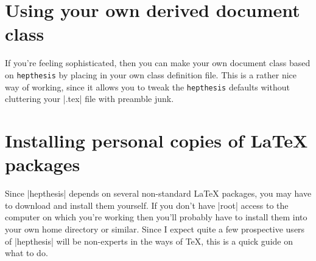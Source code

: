 \documentclass[12pt]{scrartcl}
\newcommand{\hepthesis}{\texttt{hepthesis}\xspace}
\newenvironment{snippet}{\Verbatim}{\endVerbatim}
\begin{document}
\appendix

\section{Using your own derived document class}
\label{app:DerivedClass}
If you're feeling sophisticated, then you can make your own document class based on
\hepthesis by placing
%
\begin{snippet}
\end{snippet}
%
in your own class definition file. This is a rather nice way of working, since
it allows you to tweak the \hepthesis defaults without cluttering your
|.tex| file with preamble junk.


\section{Installing personal copies of \LaTeX{} packages}
\label{app:InstallingPackages}
Since |hepthesis| depends on several non-standard \LaTeX{} packages, you may have to
download and install them yourself. If you don't have |root| access to the computer
on which you're working then you'll probably have to install them into your own home
directory or similar. Since I expect quite a few prospective users of |hepthesis| will
be non-experts in the ways of \TeX{}, this is a quick guide on what to do.
\end{document}
